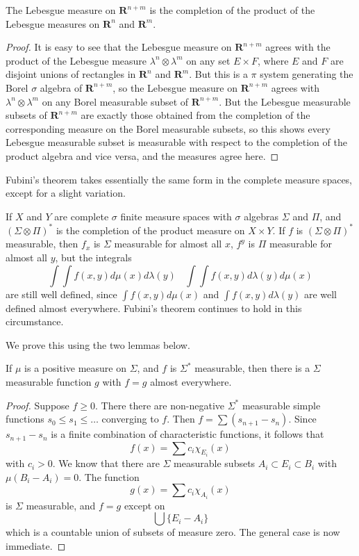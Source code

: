 \begin{theorem}
    The Lebesgue measure on $\mathbf{R}^{n + m}$ is the completion of the product of the Lebesgue measures on $\mathbf{R}^n$ and $\mathbf{R}^m$.
\end{theorem}
\begin{proof}
    It is easy to see that the Lebesgue measure on $\mathbf{R}^{n+m}$ agrees with the product of the Lebesgue measure $\lambda^n \otimes \lambda^m$ on any set $E \times F$, where $E$ and $F$ are disjoint unions of rectangles in $\mathbf{R}^n$ and $\mathbf{R}^m$. But this is a $\pi$ system generating the Borel $\sigma$ algebra of $\mathbf{R}^{n+m}$, so the Lebesgue measure on $\mathbf{R}^{n+m}$ agrees with $\lambda^n \otimes \lambda^m$ on any Borel measurable subset of $\mathbf{R}^{n+m}$. But the Lebesgue measurable subsets of $\mathbf{R}^{n+m}$ are exactly those obtained from the completion of the corresponding measure on the Borel measurable subsets, so this shows every Lebesgue measurable subset is measurable with respect to the completion of the product algebra and vice versa, and the measures agree here.
\end{proof}

Fubini's theorem takes essentially the same form in the complete measure spaces, except for a slight variation.

\begin{theorem}
    If $X$ and $Y$ are complete $\sigma$ finite measure spaces with $\sigma$ algebras $\Sigma$ and $\Pi$, and $(\Sigma \otimes \Pi)^*$ is the completion of the product measure on $X \times Y$. If $f$ is $(\Sigma \otimes \Pi)^*$ measurable, then $f_x$ is $\Sigma$ measurable for almost all $x$, $f^y$ is $\Pi$ measurable for almost all $y$, but the integrals
    \[ \int \int f(x,y) d\mu(x) d\lambda(y)\ \ \ \ \int \int f(x,y) d\lambda(y) d\mu(x) \]
    are still well defined, since $\int f(x,y) d\mu(x)$ and $\int f(x,y) d\lambda(y)$ are well defined almost everywhere. Fubini's theorem continues to hold in this circumstance.
\end{theorem}

We prove this using the two lemmas below.

\begin{lemma}
    If $\mu$ is a positive measure on $\Sigma$, and $f$ is $\Sigma^*$ measurable, then there is a $\Sigma$ measurable function $g$ with $f = g$ almost everywhere.
\end{lemma}
\begin{proof}
    Suppose $f \geq 0$. There there are non-negative $\Sigma^*$ measurable simple functions $s_0 \leq s_1 \leq \dots$ converging to $f$. Then $f = \sum (s_{n+1} - s_n)$. Since $s_{n+1} - s_n$ is a finite combination of characteristic functions, it follows that
    \[ f(x) = \sum c_i \chi_{E_i}(x) \]
    with $c_i > 0$. We know that there are $\Sigma$ measurable subsets $A_i \subset E_i \subset B_i$ with $\mu(B_i - A_i) = 0$. The function
    \[ g(x) = \sum c_i \chi_{A_i}(x) \]
    is $\Sigma$ measurable, and $f = g$ except on
    \[ \bigcup \{ E_i - A_i \} \]
    which is a countable union of subsets of measure zero. The general case is now immediate.
\end{proof}

